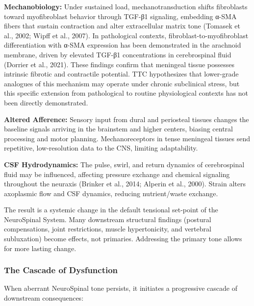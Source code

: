 \documentclass[11pt,letterpaper]{article}
\begin{document}
\textbf{Mechanobiology:} Under sustained load, mechanotransduction shifts fibroblasts toward myofibroblast behavior through TGF-β1 signaling, embedding α-SMA fibers that sustain contraction and alter extracellular matrix tone (Tomasek et al., 2002; Wipff et al., 2007). In pathological contexts, fibroblast-to-myofibroblast differentiation with α-SMA expression has been demonstrated in the arachnoid membrane, driven by elevated TGF-β1 concentrations in cerebrospinal fluid (Dorrier et al., 2021). These findings confirm that meningeal tissue possesses intrinsic fibrotic and contractile potential. TTC hypothesizes that lower-grade analogues of this mechanism may operate under chronic subclinical stress, but this specific extension from pathological to routine physiological contexts has not been directly demonstrated.


\textbf{Altered Afference:} Sensory input from dural and periosteal tissues changes the baseline signals arriving in the brainstem and higher centers, biasing central processing and motor planning. Mechanoreceptors in tense meningeal tissues send repetitive, low-resolution data to the CNS, limiting adaptability.


\textbf{CSF Hydrodynamics:} The pulse, swirl, and return dynamics of cerebrospinal fluid may be influenced, affecting pressure exchange and chemical signaling throughout the neuraxis (Brinker et al., 2014; Alperin et al., 2000). Strain alters axoplasmic flow and CSF dynamics, reducing nutrient/waste exchange.


The result is a systemic change in the default tensional set-point of the NeuroSpinal System. Many downstream structural findings (postural compensations, joint restrictions, muscle hypertonicity, and vertebral subluxation) become effects, not primaries. Addressing the primary tone allows for more lasting change.


\subsubsection{The Cascade of Dysfunction}

When aberrant NeuroSpinal tone persists, it initiates a progressive cascade of downstream consequences:
\end{document}
